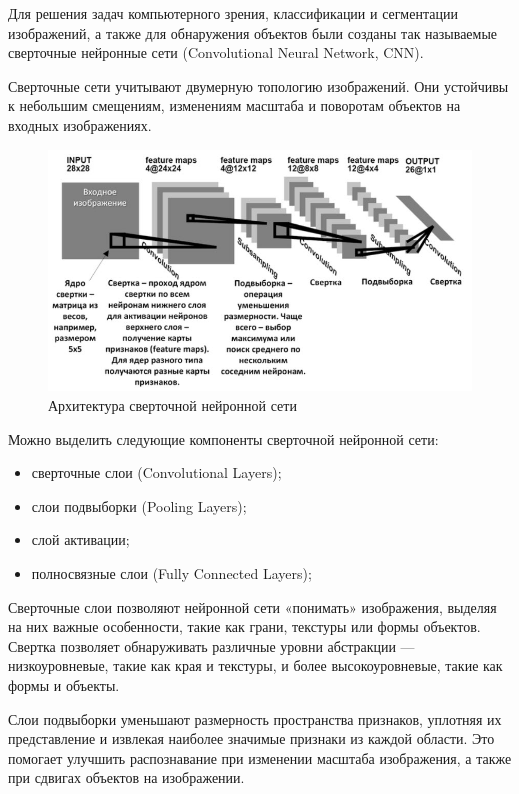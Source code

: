 Для решения задач компьютерного зрения, классификации и сегментации изображений, а также для обнаружения объектов были созданы так называемые сверточные нейронные сети (Convolutional Neural Network, CNN).

Сверточные сети учитывают двумерную топологию изображений. Они устойчивы к небольшим смещениям, изменениям масштаба и поворотам объектов на входных изображениях.\\

\begin{figure}[H]
    \centering
    \includegraphics[width = 12cm]{cnn.jpg}
    \caption{Архитектура сверточной нейронной сети}
    \label{cnn}
\end{figure}

Можно выделить следующие компоненты сверточной нейронной сети:
\begin{itemize}
    \item сверточные слои (Convolutional Layers);
    \item слои подвыборки (Pooling Layers);
    \item слой активации;
    \item полносвязные слои (Fully Connected Layers);
\end{itemize}

Сверточные слои позволяют нейронной сети «понимать» изображения, выделяя на них важные особенности, такие как грани, текстуры или формы объектов. Свертка позволяет обнаруживать различные уровни абстракции — низкоуровневые, такие как края и текстуры, и более высокоуровневые, такие как формы и объекты.

Слои подвыборки уменьшают размерность пространства признаков, уплотняя их представление и извлекая наиболее значимые признаки из каждой области. Это помогает улучшить распознавание при изменении масштаба изображения, а также при сдвигах объектов на изображении.


